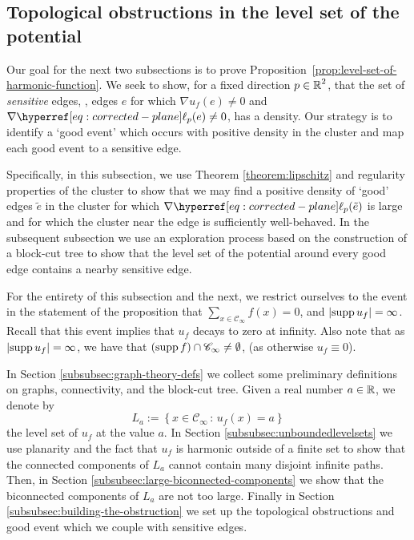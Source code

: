 \documentclass[12pt]{amsart}
\numberwithin{equation}{section}
\begin{document}
	
	\subsection{Topological obstructions in the level set of the potential} \label{subsec:obstruction}
	Our goal for the next two subsections is to prove Proposition~\ref{prop:level-set-of-harmonic-function}.  We seek to show, for a fixed direction $p \in \operatorname{\mathbb{R}}^2$, that the set of {\it sensitive} edges, \ie, edges $e$ for which $\nabla u_f(e) \neq 0$ and $\nabla \ellp{p}(e) \neq 0$, has a density. Our strategy is to identify a `good event' 
	which occurs with positive density in the cluster and map each good event to a sensitive edge.
	
	Specifically, in this subsection, we use Theorem \ref{theorem:lipschitz} and regularity properties of the cluster to 
	show that we may find a positive density of `good' edges $\tilde e$ in the cluster for which 
	$\nabla \ellp{p}(\tilde e)$ is large and for which the cluster near the edge is sufficiently well-behaved. 
	In the subsequent subsection we use an exploration process based on the construction of a block-cut tree to show that the level set of the potential around every good edge contains a nearby sensitive edge. 
	
	For the entirety of this subsection and the next, we restrict ourselves to the event in the statement of the proposition that  $\sum_{x \in \mathscr{C}_{\infty}} f(x) = 0$, and $|\mathrm{supp\,} u_f| = \infty$. Recall that this event implies that $u_f$ decays to zero at infinity. 
	Also note that as $|\mathrm{supp\,} u_f| = \infty$, we have that  $(\mathrm{supp\,} f ) \cap \mathscr{C}_\infty \neq \emptyset$, (as otherwise $u_f \equiv 0$).  
	
	
	In Section \ref{subsubsec:graph-theory-defs} we collect some preliminary definitions on graphs, connectivity, 
	and the block-cut tree. Given a real number $a \in \operatorname{\mathbb{R}}$, we denote by
	\begin{equation} \label{eq:level-set-def}
		L_a := \left\{ x \in \mathscr{C}_\infty \, : \, u_f(x) = a \right\}
	\end{equation}
	the level set of $u_f$ at the value $a$.  In Section \ref{subsubsec:unboundedlevelsets} we use planarity
	and the fact that $u_f$ is harmonic outside of a finite set to show that the connected components of $L_a$ cannot contain many disjoint infinite paths.  Then, in Section \ref{subsubsec:large-biconnected-components} 
	we show that the biconnected components of $L_a$ are not too large. Finally 
	in Section \ref{subsubsec:building-the-obstruction} we set up the topological obstructions and good event which
	we couple with sensitive edges. 
	
\end{document}
